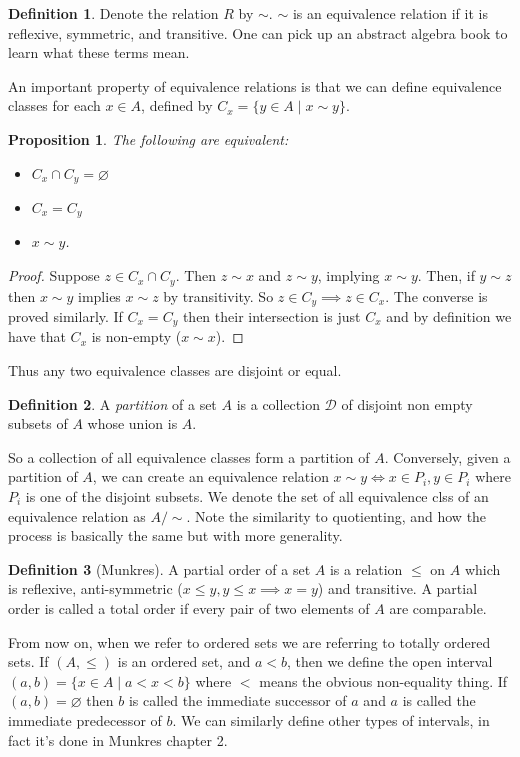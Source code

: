 \documentclass[12pt]{article}
\theoremstyle{plain}
\newtheorem{proposition}{Proposition}
\theoremstyle{definition}
\newtheorem{definition}{Definition}
\begin{document}
\begin{definition}
Denote the relation $R$ by $\sim$. $\sim$ is an equivalence relation if it is reflexive, symmetric, and transitive. One can pick up an abstract algebra book to learn what these terms mean.
\end{definition}

An important property of equivalence relations is that we can define equivalence classes for each $x \in A$, defined by $C_x = \{y \in A \mid x \sim y\}.$ 

\begin{proposition}
The following are equivalent:
\begin{itemize}
	\item $C_x \cap C_y = \varnothing$
	\item $C_x = C_y$
	\item $x \sim y$.
\end{itemize}
\end{proposition}
\begin{proof}
	Suppose $z \in C_x \cap C_y$. Then $z \sim x$ and $z \sim y$, implying $x \sim y$. Then, if $y \sim z$ then $x \sim y$ implies $x \sim z$ by transitivity. So $z \in C_y \implies z \in C_x$. The converse is proved similarly. If $C_x = C_y$ then their intersection is just $C_x$ and by definition we have that $C_x$ is non-empty ($x \sim x$).
\end{proof}

Thus any two equivalence classes are disjoint or equal.

\begin{definition}
	A \textit{partition} of a set $A$ is a collection $\mathcal{D}$ of disjoint non empty subsets of $A$ whose union is $A$.
\end{definition}

So a collection of all equivalence classes form a partition of $A$. Conversely, given a partition of $A$, we can create an equivalence relation $x \sim y \iff x \in P_i, y \in P_i$ where $P_i$ is one of the disjoint subsets. We denote the set of all equivalence clss of an equivalence relation as $A/\sim$. Note the similarity to quotienting, and how the process is basically the same but with more generality.

\begin{definition}[Munkres]
A partial order of a set $A$ is a relation $\leq$ on $A$ which is reflexive, anti-symmetric ($x \leq y, y \leq x \implies x = y$) and transitive. A partial order is called a total order if every pair of two elements of $A$ are comparable.
\end{definition}
From now on, when we refer to ordered sets we are referring to totally ordered sets.
If $(A, \leq)$ is an ordered set, and $a < b$, then we define the open interval $(a, b) = \{x \in A\mid a < x < b\}$ where $<$ means the obvious non-equality thing. If $(a, b) = \varnothing$ then $b$ is called the immediate successor of $a$ and $a$ is called the immediate predecessor of $b$. We can similarly define other types of intervals, in fact it's done in Munkres chapter 2.
\end{document}
